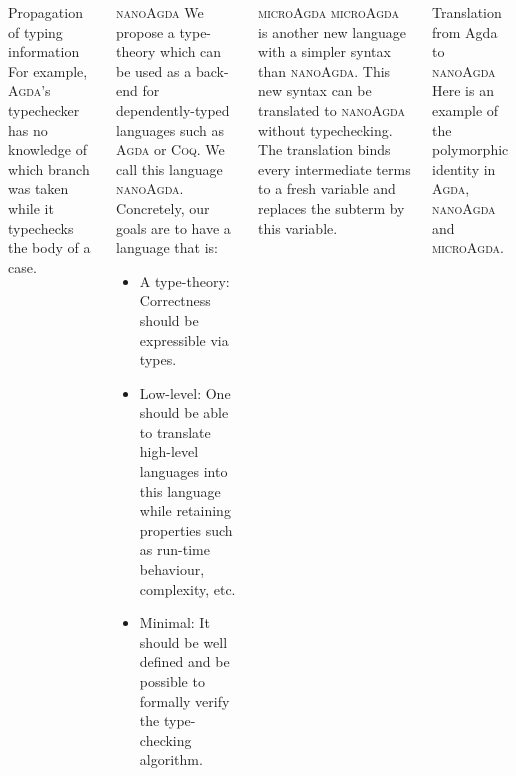 \documentclass[final, xcolor=svgnames]{beamer}
\newcommand{\coq}{\textsc{Coq}\xspace}
\newcommand{\agda}{\textsc{Agda}\xspace}
\newcommand{\ma}{\textsc{microAgda}\xspace}
\newcommand{\na}{\textsc{nanoAgda}\xspace}
\begin{document}
\begin{frame}[shrink]
\begin{columns}[c]
\begin{block}{Propagation of typing information}
      For example, \agda's typechecker has no knowledge of which branch was taken while it typechecks the body of a case.
      \begin{center}
        \begin{minipage}{0.95\textwidth}
          
        \end{minipage}
     \end{center}
   \end{block}
   \begin{block}{\na}
     We propose a type-theory which can be used as a back-end for dependently-typed languages such as \agda or \coq. We call this language \na. Concretely, our goals are to have a language that is:
     \begin{itemize}
     \item A type-theory: Correctness should be expressible via types.
     \item Low-level: One should be able to translate high-level languages into this language while retaining properties such as run-time behaviour, complexity, etc.
     \item Minimal: It should be well defined and be possible to formally verify the type-checking algorithm.
     \end{itemize}
   \end{block}
   \begin{block}{\ma}
     \ma is another new language with a simpler syntax than \na. This new syntax can be translated to \na without typechecking. The translation binds every intermediate terms to a fresh variable and replaces the subterm by this variable.
   \end{block}
   \begin{block}{Translation from Agda to \na}
     Here is an example of the polymorphic identity in \agda, \na and \ma.
     \begin{figure}
     \end{figure}
   \end{block}
 \end{columns}
 \centering
\end{frame}
\end{document}
